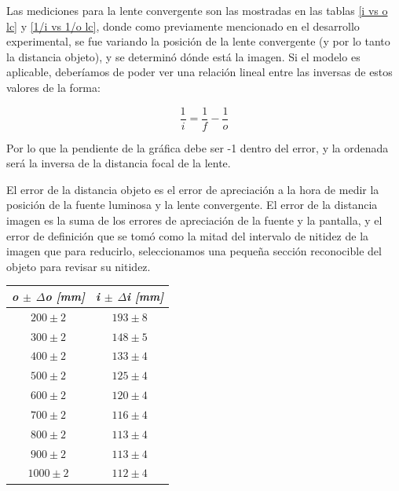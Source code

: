 \documentclass[a4paper,12pt]{article}
\newenvironment{Figure}
  {\par\medskip\noindent\minipage{\linewidth}}
  {\endminipage\par\medskip}
\begin{document}
\begin{multicols*}{2}
        Las mediciones para la lente convergente son las mostradas en las tablas \ref{i vs o lc} y \ref{1/i vs 1/o lc}, donde como previamente mencionado en el desarrollo experimental, se fue variando la posición de la lente convergente (y por lo tanto la distancia objeto), y se determinó dónde está la imagen. Si el modelo es aplicable, deberíamos de poder ver una relación lineal entre las inversas de estos valores de la forma:

        \begin{equation*}
            \frac{1}{i} = \frac{1}{f} - \frac{1}{o}
        \end{equation*}

        Por lo que la pendiente de la gráfica debe ser -1 dentro del error, y la ordenada será la inversa de la distancia focal de la lente.

        El error de la distancia objeto es el error de apreciación a la hora de medir la posición de la fuente luminosa y la lente convergente. El error de la distancia imagen es la suma de los errores de apreciación de la fuente y la pantalla, y el error de definición que se tomó como la mitad del intervalo de nitidez de la imagen que para reducirlo, seleccionamos una pequeña sección reconocible del objeto para revisar su nitidez.

        \begin{Figure}
            \centering

            \begin{tabular}{cc}
                \toprule
                \textit{\textbf{o $\pm$ $\Delta$o [mm]}} & \textit{\textbf{i $\pm$ $\Delta$i [mm]}}\\
                \midrule
                $200 \pm 2$ & $193 \pm 8$ \\ 
                $300 \pm 2$ & $148 \pm 5$ \\ 
                $400 \pm 2$ & $133 \pm 4$ \\ 
                $500 \pm 2$ & $125 \pm 4$ \\ 
                $600 \pm 2$ & $120 \pm 4$ \\ 
                $700 \pm 2$ & $116 \pm 4$ \\ 
                $800 \pm 2$ & $113 \pm 4$ \\    
                $900 \pm 2$ & $113 \pm 4$ \\ 
                $1000 \pm 2$ & $112 \pm 4$ \\ 
                \bottomrule
            \end{tabular}


\end{Figure}
\end{multicols*}
\end{document}
